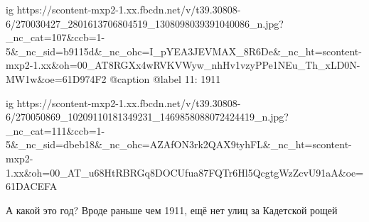  
 
 
 
 

\ifcmt
  ig https://scontent-mxp2-1.xx.fbcdn.net/v/t39.30808-6/270030427_2801613706804519_1308098039391040086_n.jpg?_nc_cat=107&ccb=1-5&_nc_sid=b9115d&_nc_ohc=I_pYEA3JEVMAX_8R6De&_nc_ht=scontent-mxp2-1.xx&oh=00_AT8RGXx4wRVKVWyw_nhHv1vzyPPe1NEu_Th_xLD0N-MW1w&oe=61D974F2
  @caption @label 11: 1911
\fi


\ifcmt
  ig https://scontent-mxp2-1.xx.fbcdn.net/v/t39.30808-6/270050869_10209110181349231_1469858088072424419_n.jpg?_nc_cat=111&ccb=1-5&_nc_sid=dbeb18&_nc_ohc=AZAfON3rk2QAX9tyhFL&_nc_ht=scontent-mxp2-1.xx&oh=00_AT_u68HtRBRGq8DOCUfua87FQTr6Hl5QcgtgWzZcvU91aA&oe=61DACEFA
\fi

А какой это год? Вроде раньше чем 1911, ещё нет улиц за Кадетской рощей
